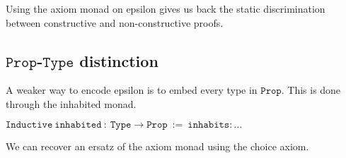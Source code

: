 \documentclass{article}
\theoremstyle{definition}
\theoremstyle{remark}
\begin{document}
Using the axiom monad on epsilon gives us back the static discrimination between constructive and non-constructive proofs.

\subsection{$\mathtt{Prop}$-$\mathtt{Type}$ distinction}

A weaker way to encode epsilon is to embed every type in $\mathtt{Prop}$. This is done through the inhabited monad.

$\mathtt{Inductive\ inhabited\ :\ Type \rightarrow Prop\ :=\ inhabits :} \hdots $

We can recover an ersatz of the axiom monad using the choice axiom.
\end{document}
